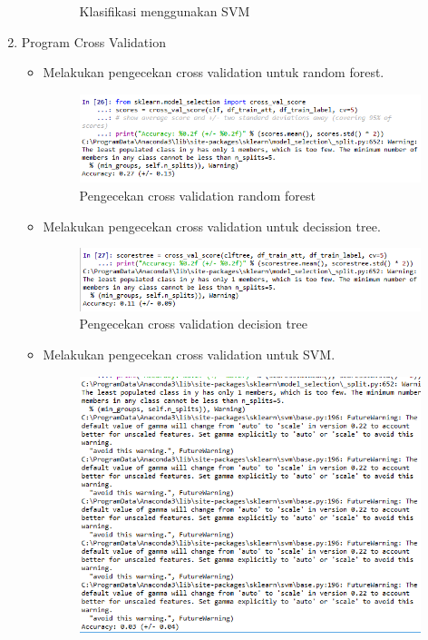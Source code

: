 \begin{enumerate}
\begin{enumerate}
\begin{figure}[!hbtp]
				\caption{Klasifikasi menggunakan SVM}
				\label{contoh}
				\end{figure}
	\end{enumerate}
\item Program Cross Validation
	\begin{itemize}
		\item Melakukan pengecekan cross validation untuk random forest.
			\begin{figure}[!hbtp]
			\centering
			\includegraphics[scale=0.5]{figures/AIP/ai32.PNG}
			\caption{Pengecekan cross validation random forest}
			\label{contoh}
			\end{figure}
		\item Melakukan pengecekan cross validation untuk decission tree.
			\begin{figure}[!hbtp]
			\centering
			\includegraphics[scale=0.5]{figures/AIP/ai33.PNG}
			\caption{Pengecekan cross validation decision tree}
			\label{contoh}
			\end{figure}
		\item Melakukan pengecekan cross validation untuk SVM.
			\begin{figure}[!hbtp]
			\centering
			\includegraphics[scale=0.5]{figures/AIP/ai34.PNG}

\end{figure}
\end{itemize}
\end{enumerate}

